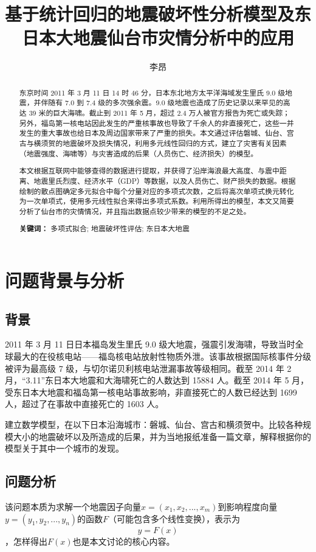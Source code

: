 \documentclass[UTF8]{ctexart}
\author{李昂}
\title{基于统计回归的地震破坏性分析模型及东日本大地震仙台市灾情分析中的应用}
\begin{document}
\maketitle
\begin{abstract}
东京时间 2011 年 3 月 11 日 14 时 46 分，日本东北地方太平洋海域发生里氏 9.0 级地震，并伴随有 7.0 到 7.4 级的多次强余震。9.0 级地震也造成了历史记录以来罕见的高达 39 米的巨大海啸。截止到 2011 年 5 月，超过 2.4 万人被官方报告为死亡或失踪；另外，福岛第一核电站因此发生的严重核事故也导致了千余人的非直接死亡，这些一并发生的重大事故也给日本及周边国家带来了严重的损失。本文通过评估磐城、仙台、宫古与横须贺的地震破坏及损失情况，利用多元线性回归的方式，建立了灾害有关因素（地震强度、海啸等）与灾害造成的后果（人员伤亡、经济损失）的模型。

本文根据互联网中能够查得的数据进行提取，并获得了沿岸海浪最大高度、与震中距离、地震里氏烈度、经济水平（GDP）等数据，以及人员伤亡、财产损失的数据。根据绘制的散点图确定多元拟合中每个分量对应的多项式次数，之后将高次单项式换元转化为一次单项式，使用多元线性拟合来得出多项式系数。利用所得出的模型，本文又简要分析了仙台市的灾情情况，并且指出数据点较少带来的模型的不足之处。
\begin{flushleft}
\textbf{关键词：} 多项式拟合; 地震破坏性评估; 东日本大地震
\end{flushleft}
\end{abstract}

\clearpage

\section{问题背景与分析}
\subsection{背景}
2011 年 3 月 11 日日本福岛发生里氏 9.0 级大地震，强震引发海啸，导致当时全球最大的在役核电站——福岛核电站放射性物质外泄。该事故根据国际核事件分级被评为最高级 7 级，与切尔诺贝利核电站泄漏事故等级相同。截至 2014 年 2 月，“3.11”东日本大地震和大海啸死亡的人数达到 15884 人。截至 2014 年 5 月，受东日本大地震和福岛第一核电站事故影响，非直接死亡的人数已经达到 1699 人，超过了在事故中直接死亡的 1603 人。

建立数学模型，在以下日本沿海城市：磐城、仙台、宫古和横须贺中。比较各种规模大小的地震破坏以及所造成的后果，并为当地报纸准备一篇文章，解释根据你的模型关于其中一个城市的发现。

\subsection{问题分析}
该问题本质为求解一个地震因子向量$x = (x_1, x_2, ..., x_m)$到影响程度向量$y = (y_1, y_2, ..., y_n)$的函数$F$（可能包含多个线性变换），表示为
$$y = F(x)$$
，怎样得出$F(x)$也是本文讨论的核心内容。
\end{document}
